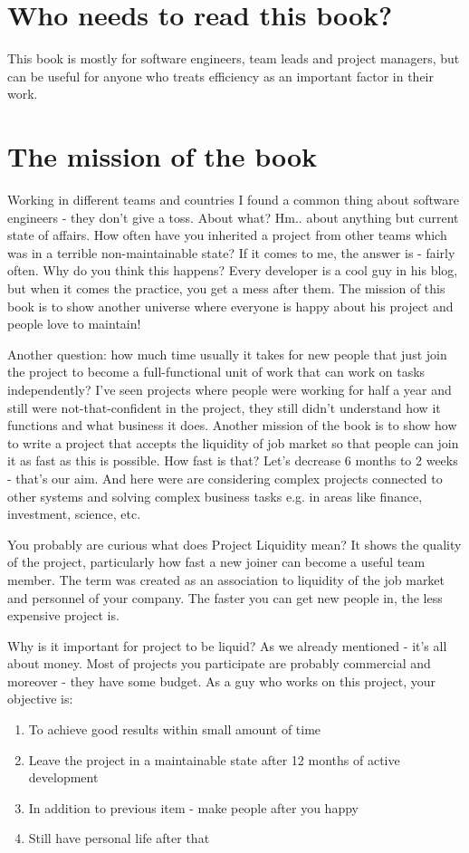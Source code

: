 \documentclass[11pt,a4paper,oneside]{article}
\begin{document}
\section{Who needs to read this book?}
This book is mostly for software engineers, team leads and project managers, but can be useful for anyone who treats efficiency as an important factor in their work.

\section{The mission of the book}
Working in different teams and countries I found a common thing about software engineers - they don't give a toss. About what? Hm.. about anything but current state of affairs. How often have you inherited a project from other teams which was in a terrible non-maintainable state? If it comes to me, the answer is - fairly often. Why do you think this happens? Every developer is a cool guy in his blog, but when it comes the practice, you get a mess after them. The mission of this book is to show another universe where everyone is happy about his project and people love to maintain! 

Another question: how much time usually it takes for new people that just join the project to become a full-functional unit of work that can work on tasks independently? I've seen projects where people were working for half a year and still were not-that-confident in the project, they still didn't understand how it functions and what business it does. Another mission of the book is to show how to write a project that accepts the liquidity of job market so that people can join it as fast as this is possible. How fast is that? Let's decrease 6 months to 2 weeks - that's our aim. And here were are considering complex projects connected to other systems and solving complex business tasks e.g. in areas like finance, investment, science, etc.

You probably are curious what does Project Liquidity mean? It shows the quality of the project, particularly how fast a new joiner can become a useful team member. The term was created as an association to liquidity of the job market and personnel of your company. The faster you can get new people in, the less expensive project is.

Why is it important for project to be liquid? As we already mentioned - it's all about money. Most of projects you participate are probably commercial and moreover - they have some budget. As a guy who works on this project, your objective is: 
\begin{enumerate}
 \item To achieve good results within small amount of time
 \item Leave the project in a maintainable state after 12 months of active development
 \item In addition to previous item - make people after you happy
 \item Still have personal life after that 
\end{enumerate}
\end{document}
